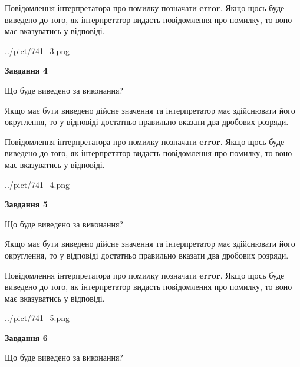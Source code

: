 \documentclass[12pt, ukrainian]{article}
\begin{document}
{\begin {Large}
Повідомлення інтерпретатора про помилку позначати \textbf{error}.
Якщо щось буде виведено до того, як інтерпретатор видасть повідомлення про помилку, 
то воно має вказуватись у відповіді. \par

\begin{center}
	{../pict/741_3.png}
\end{center}
\newpage

{\begin {center}\textbf{Завдання 4}\end {center}}\par
Що буде виведено за виконання? \par

Якщо має бути виведено дійсне значення та інтерпретатор має здійснювати його округлення, 
то у відповіді достатньо правильно вказати два дробових розряди.

Повідомлення інтерпретатора про помилку позначати \textbf{error}.
Якщо щось буде виведено до того, як інтерпретатор видасть повідомлення про помилку, 
то воно має вказуватись у відповіді. \par

\begin{center}
	{../pict/741_4.png}
\end{center}
\newpage

{\begin {center}\textbf{Завдання 5}\end {center}}\par
Що буде виведено за виконання? \par

Якщо має бути виведено дійсне значення та інтерпретатор має здійснювати його округлення, 
то у відповіді достатньо правильно вказати два дробових розряди.

Повідомлення інтерпретатора про помилку позначати \textbf{error}.
Якщо щось буде виведено до того, як інтерпретатор видасть повідомлення про помилку, 
то воно має вказуватись у відповіді. \par

\begin{center}
	{../pict/741_5.png}
\end{center}
\newpage

{\begin {center}\textbf{Завдання 6}\end {center}}\par
Що буде виведено за виконання? \par


\end{Large}}
\end{document}
